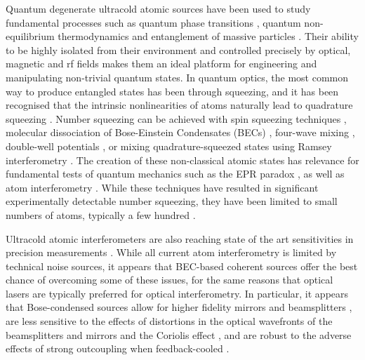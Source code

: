 \documentclass{iopart}
\begin{document}
Quantum degenerate ultracold atomic sources have been used to study fundamental processes such as quantum phase transitions \cite{Leggett2001,Buluta2009}, quantum non-equilibrium thermodynamics \cite{Kinoshita:2006,Barnett:2011} and entanglement of massive particles \cite{Kheruntsyan:2005}.  Their ability to be highly isolated from their environment and controlled precisely by optical, magnetic and rf fields makes them an ideal platform for engineering and manipulating non-trivial quantum states. In quantum optics, the most common way to produce entangled states has been through squeezing, and it has been recognised that the intrinsic nonlinearities of atoms naturally lead to quadrature squeezing \cite{Kheruntsyan:2005, johnssonET2007, wuester2008, haineET2009, doeringET2010}.  Number squeezing can be achieved with spin squeezing techniques \cite{kitagawaET1993, gross2010, sinatra2012}, molecular dissociation of Bose-Einstein Condensates (BECs) \cite{kheruntsyanET2002,davisET2008,savage2007,ogren2010}, four-wave mixing \cite{perrin2008, ogren2009, jascula2010}, double-well potentials \cite{esteve2008, maussang2010}, or mixing quadrature-squeezed states using Ramsey interferometry \cite{haineET2009}. The creation of these non-classical atomic states has relevance for fundamental tests of quantum mechanics such as the EPR paradox \cite{ogren2010, pu2000, sorensen2001, haine2005,zhao2007}, as well as atom interferometry \cite{doeringET2010, gross2010, sorensenET1999, kuzmichET2000, meyerET2001, liebfriedET2004, roosET2006}.
While these techniques have resulted in significant experimentally detectable number squeezing, they have been limited to small numbers of atoms, typically a few hundred \cite{gross2010, esteve2008}. 

Ultracold atomic interferometers are also reaching state of the art sensitivities in precision measurements \cite{robins:2013, altinET2013}. While all current atom interferometry is limited by technical noise sources, it appears that BEC-based coherent sources offer the best chance of overcoming some of these issues, for the same reasons that optical lasers are typically preferred for optical interferometry. In particular, it appears that Bose-condensed sources allow for higher fidelity mirrors and beamsplitters \cite{szigeti:2012}, are less sensitive to the effects of distortions in the optical wavefronts of the beamsplitters and mirrors and the Coriolis effect \cite{Debs:2011, robins:2013}, and are robust to the adverse effects of strong outcoupling when feedback-cooled \cite{semiclassicalstabilization, Szigeti:2009, Szigeti:2010}. 
\end{document}
